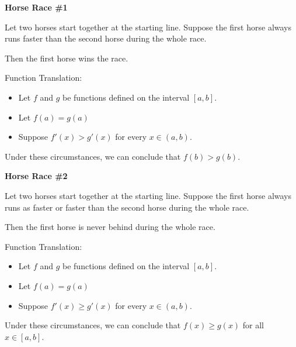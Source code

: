 \documentclass{ximera}
\begin{document}
\begin{idea} \textbf{\textcolor{blue!55!black}{Horse Race \#1}}   


Let two horses start together at the starting line. Suppose the first horse always runs faster than the second horse during the whole race.

Then the first horse wins the race.



\begin{model} Function Translation:

\begin{itemize}
\item Let $f$ and $g$ be functions defined on the interval $[a, b]$. 
\item Let $f(a) = g(a)$
\item Suppose $f'(x) > g'(x)$ for every $x \in (a,b)$. 
\end{itemize}

Under these circumstances, we can conclude that $f(b) > g(b)$.

\end{model} 




\end{idea}












\begin{idea} \textbf{\textcolor{blue!55!black}{Horse Race \#2}}   


Let two horses start together at the starting line. Suppose the first horse always runs as faster or faster than the second horse during the whole race.

Then the first horse is never behind during the whole race.



\begin{model} Function Translation:

\begin{itemize}
\item Let $f$ and $g$ be functions defined on the interval $[a, b]$. 
\item Let $f(a) = g(a)$
\item Suppose $f'(x) \geq g'(x)$ for every $x \in (a,b)$. 
\end{itemize}

Under these circumstances, we can conclude that $f(x) \geq g(x)$ for all $x \in [a,b]$.

\end{model}

\end{idea}
\end{document}
